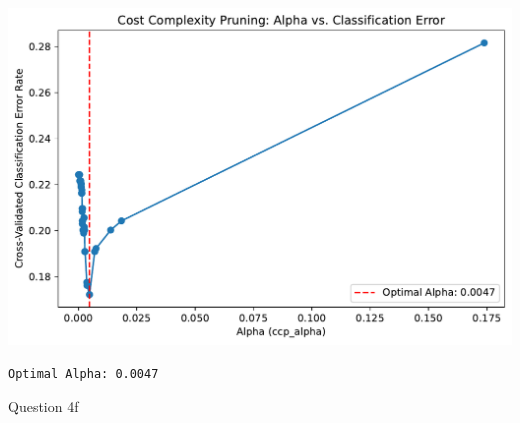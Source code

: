 \documentclass[
  letterpaper,
  DIV=11,
  numbers=noendperiod]{scrartcl}
\begin{document}
\includegraphics{Untitled-1_files/figure-pdf/cell-13-output-1.pdf}

\begin{verbatim}
Optimal Alpha: 0.0047
\end{verbatim}

Question 4f
\end{document}

